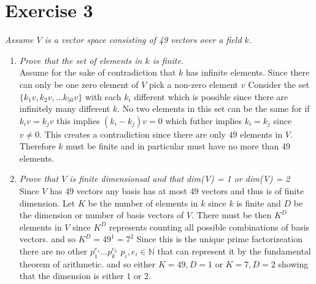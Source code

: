 \documentclass{article}
\begin{document}
    \section{Exercise 3}
    \emph{Assume $V$ is a vector space consisting of 49 vectors over a field $k$.}
    \begin{enumerate}
        \item \emph{Prove that the set of elements in $k$ is finite.}\\
            Assume for the sake of contradiction that $k$ has infinite elements. Since there can only be one zero element of $V$ pick a non-zero element $v$ 
            Consider the set $\{k_1v,k_2v,...k_{50}v\}$ with each $k_i$ different which is possible since there are infinitely many different $k$.  No two elements in this set can be the same
            for if $k_iv = k_jv$ this implies $(k_i-k_j)v = 0$ which futher implies $k_i = k_j$ since $v \ne 0$. This creates a contradiction since there are only $49$ elements in $V$.
            Therefore $k$ must be finite and in particular must have no more than 49 elements.
        \item \emph{Prove that $V$ is finite dimensionsal and that dim(V) = 1 or dim(V) = 2}\\
            Since $V$ has 49 vectors any basis has at most $49$ vectors and thus is of finite dimension.
            Let $K$ be the number of elements in $k$ since $k$ is finite and $D$ be the dimension or number of basis vectors of $V$.
            There must be then $K^{D}$ elements in $V$ since $K^{D} $ represents counting all possible combinations of basis vectors.
            and so $K^{D} = 49^{1} = 7^2$ Since this is the unique prime factorizeation there are no other $p_1^{e_1}...p_k^{e_k}$ $p_i,e_i \in \mathbb{N} $ that can represent it by the fundamental theorem of arithmetic. and so
            either $K = 49, D = 1$ or $K = 7, D = 2$ showing that the dimension is either $1$ or $2$.
    \end{enumerate}
\end{document}
